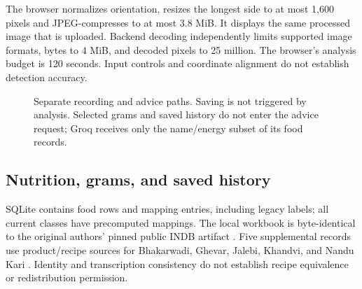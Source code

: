 \documentclass[conference]{IEEEtran}
\begin{document}
The browser normalizes orientation, resizes the longest side to at most 1,600 pixels and JPEG-compresses to at most 3.8 MiB. It displays the same processed image that is uploaded. Backend decoding independently limits supported image formats, bytes to 4 MiB, and decoded pixels to 25 million. The browser's analysis budget is 120 seconds. Input controls and coordinate alignment do not establish detection accuracy.
\begin{figure}[tbp]
\centering
{}
\caption{Separate recording and advice paths. Saving is not triggered by analysis. Selected grams and saved history do not enter the advice request; Groq receives only the name/energy subset of its food records.}
\label{fig:flow}
\end{figure}

\subsection{Nutrition, grams, and saved history}
SQLite contains \NutritionRows{} food rows and \MappingRows{} mapping entries, including legacy labels; all \AuditClasses{} current classes have precomputed mappings. The local workbook is byte-identical to the original authors' pinned public INDB artifact \cite{indb_artifact_2024}. Five supplemental records use product/recipe sources for Bhakarwadi, Ghevar, Jalebi, Khandvi, and Nandu Kari \cite{fatsecret_bhakarwadi_2026,clearcals_ghevar_2026,clearcals_jalebi_2026,clearcals_khandvi_2026,clearcals_nandu_kari_2026}. Identity and transcription consistency do not establish recipe equivalence or redistribution permission.
\end{document}

